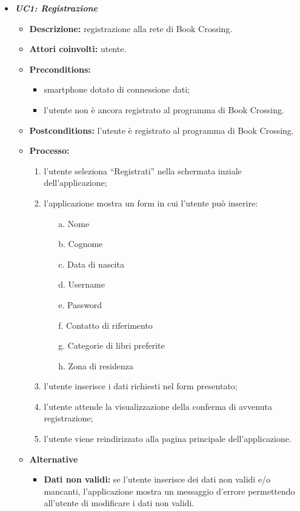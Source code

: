 

\begin{itemize}
	\item \textbf{\textit{UC1: Registrazione}}
	\begin{itemize}
		\item \textbf{Descrizione:} registrazione alla rete di Book Crossing.
		\item \textbf{Attori coinvolti:} utente.
		\item \textbf{Preconditions:} 
		\begin{itemize}
			\item smartphone dotato di connessione dati;
			\item l’utente non è ancora registrato al programma di Book Crossing.
		\end{itemize}
		\item \textbf{Postconditions:} l’utente è registrato al programma di Book Crossing.
		\item \textbf{Processo:}
		\begin{enumerate}
			\item l’utente seleziona “Registrati” nella schermata inziale dell’applicazione;
			\item l’applicazione mostra un form in cui l'utente può inserire:
			\begin{enumerate}
				\item [a.] Nome
				\item [b.] Cognome
				\item [c.] Data di nascita
				\item [d.] Username
				\item [e.] Password
				\item [f.] Contatto di riferimento
				\item [g.] Categorie di libri preferite
				\item [h.] Zona di residenza
			\end{enumerate}
			\item l’utente inserisce i dati richiesti nel form presentato;
			\item l'utente attende la visualizzazione della conferma di avvenuta registrazione;
			\item l’utente viene reindirizzato alla pagina principale dell’applicazione.
		\end{enumerate}
		\item \textbf{Alternative}
		\begin{itemize}
			\item \textbf{Dati non validi:} se l'utente inserisce dei dati non validi e/o mancanti, l'applicazione mostra un messaggio d'errore permettendo all'utente di modificare i dati non validi.

\end{itemize}
\end{itemize}
\end{itemize}
